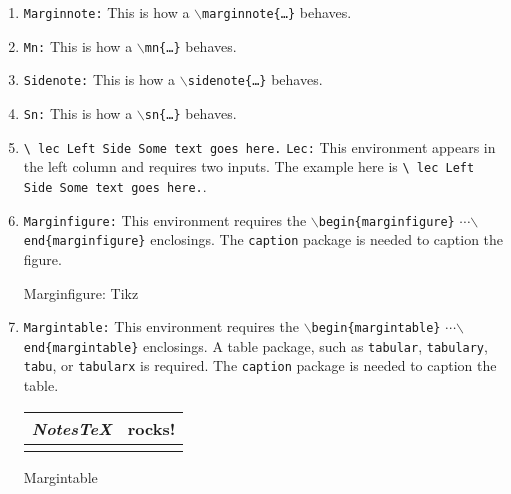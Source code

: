 \documentclass[10pt]{article}
\begin{document}
\begin{enumerate}
	\item{} \texttt{Marginnote:} This is how a \texttt{\( \backslash \)marginnote\{\ldots{}\}} behaves.
	\item{} \texttt{Mn:} This is how a \texttt{\( \backslash \)mn\{\ldots{}\}} behaves.
	\item{} \texttt{Sidenote:} This is how a \texttt{\( \backslash \)sidenote\{\ldots{}\}} behaves.
	\item{} \texttt{Sn:} This is how a \texttt{\( \backslash \)sn\{\ldots{}\}} behaves.
	\item{} \texttt{\textbackslash{} lec\textbraceleft{} Left Side\textbraceright\textbraceleft{} Some text goes here.\textbraceright} \texttt{Lec:} This environment appears in the left column and requires two inputs. The example here is \texttt{\textbackslash{} lec\textbraceleft{} Left Side\textbraceright\textbraceleft{} Some text goes here.\textbraceright}.
	\item{} \texttt{Marginfigure:} This environment requires the \texttt{\( \backslash \)begin\{marginfigure\}} {\( \cdots \)}\newline\texttt{\( \backslash \)end\{marginfigure\}} enclosings. The \texttt{caption} package is needed to caption the figure.
	\begin{marginfigure}
		\begin{center}
		\end{center}
		\caption{Marginfigure: Tikz}
	\end{marginfigure}%
	\item{} \texttt{Margintable:} This environment requires the \texttt{\( \backslash \)begin\{margintable\}} {\( \cdots \)}\newline\texttt{\( \backslash \)end\{margintable\}} enclosings. A table package, such as \texttt{tabular}, \texttt{tabulary}, \texttt{tabu}, or \texttt{tabularx} is required. The \texttt{caption} package is needed to caption the table.
	\begin{margintable}
		\vspace{.1in}
		\begin{tabularx}{\marginparwidth}{|X|X|}
			\hline{}
			\textit{NotesTeX} & \textbf{rocks!} \\
			\hline{}
		\end{tabularx}
		\caption{Margintable}
	\end{margintable}	\end{enumerate}
\end{document}
